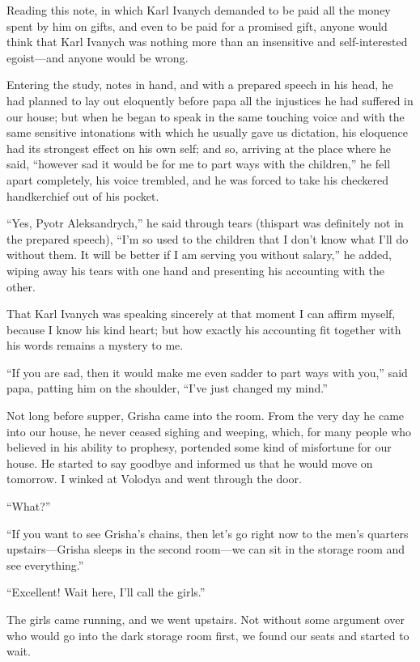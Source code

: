 Reading this note, in which Karl Ivanych demanded to be paid all the money spent by him on gifts, and even to be paid for a promised gift, anyone would think that Karl Ivanych was nothing more than an insensitive and self-interested egoist---and anyone would be wrong.

Entering the study, notes in hand, and with a prepared speech in his head, he had planned to lay out eloquently before papa all the injustices he had suffered in our house; but when he began to speak in the same touching voice and with the same sensitive intonations with which he usually gave us dictation, his eloquence had its strongest effect on his own self; and so, arriving at the place where he said, ``however sad it would be for me to part ways with the children,'' he fell apart completely, his voice trembled, and he was forced to take his checkered handkerchief out of his pocket. %

``Yes, Pyotr Aleksandrych,'' he said through tears (thispart was definitely not in the prepared speech), ``I'm so used to the children that I don't know what I'll do without them. It will be better if I am serving you without salary,'' he added, wiping away his tears with one hand and presenting his accounting with the other. %

That Karl Ivanych was speaking sincerely at that moment I can affirm myself, because I know his kind heart; but how exactly his accounting fit together with his words remains a mystery to me.

``If you are sad, then it would make me even sadder to part ways with you,'' said papa, patting him on the shoulder, ``I've just changed my mind.''

Not long before supper, Grisha came into the room. From the very day he came into our house, he never ceased sighing and weeping, which, for many people who believed in his ability to prophesy, portended some kind of misfortune for our house. He started to say goodbye and informed us that he would move on tomorrow. I winked at Volodya and went through the door.

``What?'' %

``If you want to see Grisha's chains, then let's go right now to the men's quarters upstairs---Grisha sleeps in the second room---we can sit in the storage room and see everything.'' %

``Excellent! Wait here, I'll call the girls.'' %

The girls came running, and we went upstairs. Not without some argument over who would go into the dark storage room first, we found our seats and started to wait.

